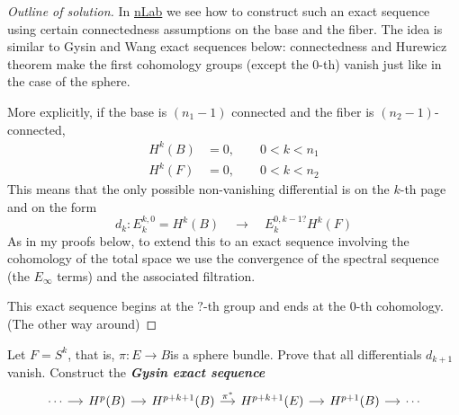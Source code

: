 \iffalse\begin{proof}[Solution]\leavevmode
	We know that
	\begin{align*}
		\beta\in\operatorname{img} \pi^*& \iff \beta c=\alpha(\pi c),\qquad \alpha\in H^{2}(B), c\text{ chain in } E\\
		\beta\in\ker \tau^*&\iff \beta c=0, \qquad\qquad  \forall c \text{ chain in }F 
	\end{align*}
	Looks like any $\beta\in \operatorname{img} \pi^*$ will be zero on the chains of $F$ because the projection will collapse them to points (but I'm not sure that a cochain representing the cohomology class will vanish on a point just because it's a point…).
\end{proof}\fi

\begin{proof}[Outline of solution]\leavevmode
	In \href{https://ncatlab.org/nlab/show/Serre+long+exact+sequence}{nLab} we see how to construct such an exact sequence using certain connectedness assumptions on the base and the fiber. The idea is similar to Gysin and Wang exact sequences below: connectedness and Hurewicz theorem make the first cohomology groups (except the 0-th) vanish just like in the case of the sphere.

	More explicitly, if the base is $(n_1-1)$ connected and the fiber is $(n_2-1)$-connected,
	\begin{align*}
		H^{k}(B)&=0,\qquad 0<k<n_1\\
		H^{k}(F)&=0,\qquad 0<k<n_2
	\end{align*}
This means that the only possible non-vanishing differential is on the $k$-th page and on the form
\[d_k:E_k^{k,0}=H^k(B)\quad \longrightarrow \quad E_k^{0,k-1?}H^k(F)\]
	As in my proofs below, to extend this to an exact sequence involving the cohomology of the total space we use the convergence of the spectral sequence (the $E_{\infty}$ terms) and the associated filtration.

	This exact sequence begins at the $?$-th group and ends at the 0-th cohomology. (The other way around)
\end{proof}

\begin{manualexercise}{2.8}
	Let $F=S^k$, that is, $\pi:E\to B$is a sphere bundle. Prove that all differentials $d_{k+1}$ vanish. Construct the \textit{\textbf{Gysin exact sequence}} 
	\[\begin{tikzcd}[column sep=small]
		\cdots\arrow[r]&H^{p}(B)\arrow[r]&H^{p+k+1}(B)\arrow[r,"\pi^*"]&H^{p+k+1}(E)\arrow[r]&H^{p+1}(B)\arrow[r]&\cdots
	\end{tikzcd}\]
\end{manualexercise}

